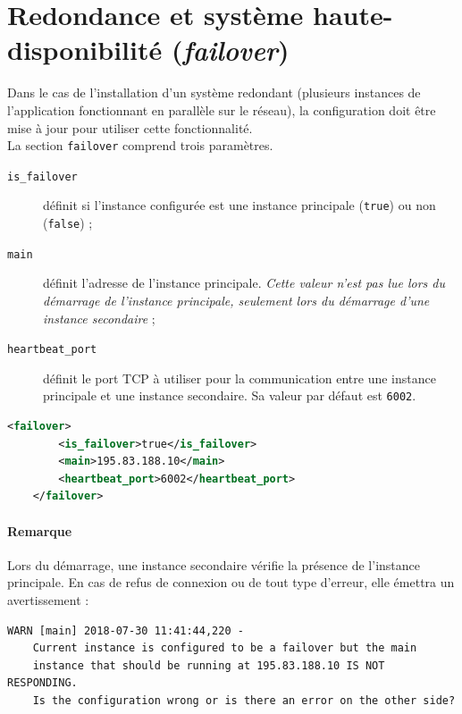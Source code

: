 \documentclass{article}
\begin{document}
\pagebreak
\section{Redondance et système haute-disponibilité (\emph{failover})}

Dans le cas de l'installation d'un système redondant (plusieurs instances de l'application fonctionnant en parallèle sur le réseau), la configuration doit être mise à jour pour utiliser cette fonctionnalité.\\ 

La section \texttt{failover} comprend trois paramètres.

\begin{description}
    \item[\texttt{is\_failover}] définit si l'instance configurée est une instance principale (\texttt{true}) ou non (\texttt{false}) ;
    \item[\texttt{main}] définit l'adresse de l'instance principale. \textit{Cette valeur n'est pas lue lors du démarrage de l'instance principale, seulement lors du démarrage d'une instance secondaire} ;
    \item[\texttt{heartbeat\_port}] définit le port TCP à utiliser pour la communication entre une instance principale et une instance secondaire. Sa valeur par défaut est \texttt{6002}.
\end{description}

\begin{lstlisting}[language=xml,name=Aperçu de la section failover]
    <failover>
        <is_failover>true</is_failover>
        <main>195.83.188.10</main>
        <heartbeat_port>6002</heartbeat_port>
    </failover>
\end{lstlisting}

\paragraph{Remarque} Lors du démarrage, une instance secondaire vérifie la présence de l'instance principale. En cas de refus de connexion ou de tout type d'erreur, elle émettra un avertissement :

\begin{verbatim}
WARN [main] 2018-07-30 11:41:44,220 - 
    Current instance is configured to be a failover but the main 
    instance that should be running at 195.83.188.10 IS NOT RESPONDING. 
    Is the configuration wrong or is there an error on the other side?
\end{verbatim}
\end{document}
